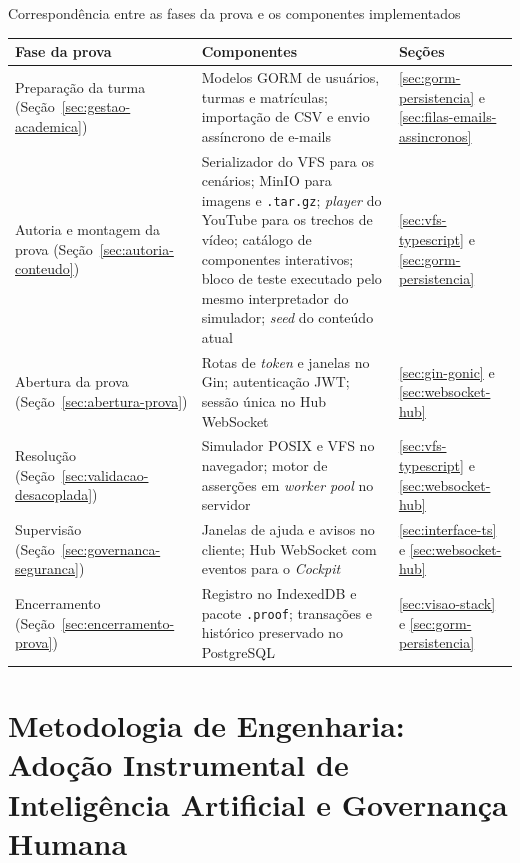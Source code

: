 \begin{quadro}[htbp]
    \caption{Correspondência entre as fases da prova e os componentes implementados}
    \label{qua:fases-componentes}
    \footnotesize
    \begin{tabularx}{\textwidth}{|>{\raggedright\arraybackslash}p{3.0cm}|L|>{\raggedright\arraybackslash}p{2.6cm}|}
        \hline
        \textbf{Fase da prova} & \textbf{Componentes} & \textbf{Seções} \\
        \hline
        Preparação da turma (Seção~\ref{sec:gestao-academica}) & Modelos GORM de usuários, turmas e matrículas; importação de CSV e envio assíncrono de e-mails & \ref{sec:gorm-persistencia} e \ref{sec:filas-emails-assincronos} \\
        \hline
        Autoria e montagem da prova (Seção~\ref{sec:autoria-conteudo}) & Serializador do VFS para os cenários; MinIO para imagens e \texttt{.tar.gz}; \textit{player} do YouTube para os trechos de vídeo; catálogo de componentes interativos; bloco de teste executado pelo mesmo interpretador do simulador; \textit{seed} do conteúdo atual & \ref{sec:vfs-typescript} e \ref{sec:gorm-persistencia} \\
        \hline
        Abertura da prova (Seção~\ref{sec:abertura-prova}) & Rotas de \textit{token} e janelas no Gin; autenticação JWT; sessão única no Hub WebSocket & \ref{sec:gin-gonic} e \ref{sec:websocket-hub} \\
        \hline
        Resolução (Seção~\ref{sec:validacao-desacoplada}) & Simulador POSIX e VFS no navegador; motor de asserções em \textit{worker pool} no servidor & \ref{sec:vfs-typescript} e \ref{sec:websocket-hub} \\
        \hline
        Supervisão (Seção~\ref{sec:governanca-seguranca}) & Janelas de ajuda e avisos no cliente; Hub WebSocket com eventos para o \textit{Cockpit} & \ref{sec:interface-ts} e \ref{sec:websocket-hub} \\
        \hline
        Encerramento (Seção~\ref{sec:encerramento-prova}) & Registro no IndexedDB e pacote \texttt{.proof}; transações e histórico preservado no PostgreSQL & \ref{sec:visao-stack} e \ref{sec:gorm-persistencia} \\
        \hline
    \end{tabularx}
\end{quadro}

\section{Metodologia de Engenharia: Adoção Instrumental de Inteligência Artificial e Governança Humana}
\label{sec:metodologia-ia}

